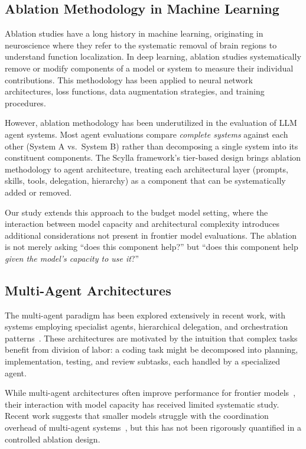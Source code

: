 \documentclass[11pt]{article}
\begin{document}
\subsection{Ablation Methodology in Machine Learning}
\label{sec:ablation_method}

Ablation studies have a long history in machine learning, originating in
neuroscience where they refer to the systematic removal of brain regions to
understand function localization. In deep learning, ablation studies
systematically remove or modify components of a model or system to measure
their individual contributions. This methodology has been applied to neural
network architectures, loss functions, data augmentation strategies, and
training procedures.

However, ablation methodology has been underutilized in the evaluation of
LLM agent systems. Most agent evaluations compare \emph{complete systems}
against each other (System A vs.\ System B) rather than decomposing a single
system into its constituent components. The Scylla framework's tier-based
design brings ablation methodology to agent architecture, treating each
architectural layer (prompts, skills, tools, delegation, hierarchy) as a
component that can be systematically added or removed.

Our study extends this approach to the budget model setting, where the
interaction between model capacity and architectural complexity introduces
additional considerations not present in frontier model evaluations. The
ablation is not merely asking ``does this component help?'' but ``does this
component help \emph{given the model's capacity to use it}?''

\subsection{Multi-Agent Architectures}
\label{sec:multi_agent}

The multi-agent paradigm has been explored extensively in recent work, with
systems employing specialist agents, hierarchical delegation, and
orchestration patterns~\cite{anthropic2024claude}. These architectures are
motivated by the intuition that complex tasks benefit from division of labor:
a coding task might be decomposed into planning, implementation, testing, and
review subtasks, each handled by a specialized agent.

While multi-agent architectures often improve performance for frontier
models~\cite{guo2024llmmultiagents}, their interaction with model capacity has
received limited systematic study. Recent work suggests that smaller models
struggle with the coordination overhead of multi-agent
systems~\cite{dervishi2025multiagent}, but this has not been rigorously
quantified in a controlled ablation design.
\end{document}
